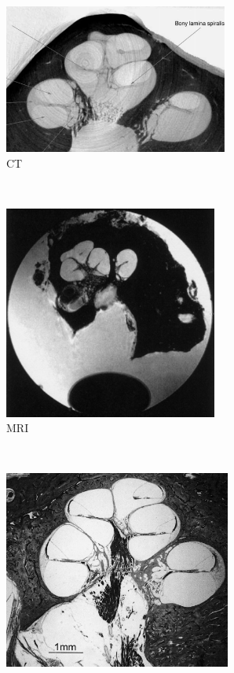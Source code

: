 \begin{figure}[p]
	\centering
	
	\begin{subfigure}[t]{0.49\textwidth}
        \centering
        \includegraphics[height=4.9cm]{Methodology/ct_human_postnov}
        \caption{CT}
        \label{fig:ct_human}
    \end{subfigure}%
    ~%
    \begin{subfigure}[t]{0.49\textwidth}
        \centering
        \includegraphics[height=7cm]{Methodology/mri_human_silver}
        \caption{MRI}
        \label{fig:mri_human}
    \end{subfigure}\\%
    \vspace{1em}%
    \begin{subfigure}[t]{0.49\textwidth}
        \centering
        \includegraphics[height=6.5cm]{Methodology/histo_human_rattay}

\end{subfigure}
\end{figure}
